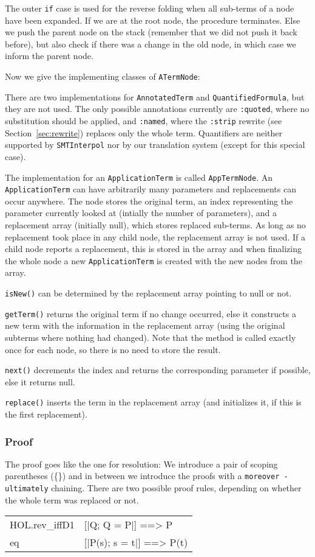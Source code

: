 \documentclass[10pt,a4paper]{article}
\newcommand{\si}{\texttt{SMTInterpol}\xspace}
\newcommand{\ttt}{\texttt}
\newenvironment{pt}[1]{\begin{center}\begin{tt}\begin{tabular}{#1}\hline}{\end{tabular}\end{tt}\end{center}}
\newcommand{\pl}[1]{#1 \\[1mm]}
\begin{document}
The outer \ttt{if} case is used for the reverse folding when all sub-terms of a node have been expanded. If we are at the root node, the procedure terminates. Else we push the parent node on the stack (remember that we did not push it back before), but also check if there was a change in the old node, in which case we inform the parent node.

\smallskip

Now we give the implementing classes of \ttt{ATermNode}:

\smallskip

There are two implementations for \ttt{AnnotatedTerm} and \ttt{QuantifiedFormula}, but they are not used. The only possible annotations currently are \ttt{:quoted}, where no substitution should be applied, and \ttt{:named}, where the  \ttt{:strip} rewrite (see Section~\ref{sec:rewrite}) replaces only the whole term. Quantifiers are neither supported by \si nor by our translation system (except for this special case).

\smallskip

The implementation for an \ttt{ApplicationTerm} is called \ttt{AppTermNode}. An \ttt{ApplicationTerm} can have arbitrarily many parameters and replacements can occur anywhere. The node stores the original term, an index representing the parameter currently looked at (intially the number of parameters), and a replacement array (initially null), which stores replaced sub-terms. As long as no replacement took place in any child node, the replacement array is not used. If a child node reports a replacement, this is stored in the array and when finalizing the whole node a new \ttt{ApplicationTerm} is created with the new nodes from the array.

\ttt{isNew()} can be determined by the replacement array pointing to null or not.

\ttt{getTerm()} returns the original term if no change occurred, else it constructs a new term with the information in the replacement array (using the original subterms where nothing had changed). Note that the method is called exactly once for each node, so there is no need to store the result.

\ttt{next()} decrements the index and returns the corresponding parameter if possible, else it returns null.

\ttt{replace()} inserts the term in the replacement array (and initializes it, if this is the first replacement).
%
\subsubsection*{Proof}
The proof goes like the one for resolution: We introduce a pair of scoping parentheses (\{\}) and in between we introduce the proofs with a \ttt{moreover - ultimately} chaining. There are two possible proof rules, depending on whether the whole term was replaced or not.
%
\begin{pt}{ll}
	\pl{HOL.rev\_iffD1 & [|Q; Q = P|] ==> P}
	\pl{eq & [|P(s); s = t|] ==> P(t)}
\end{pt}
\end{document}
